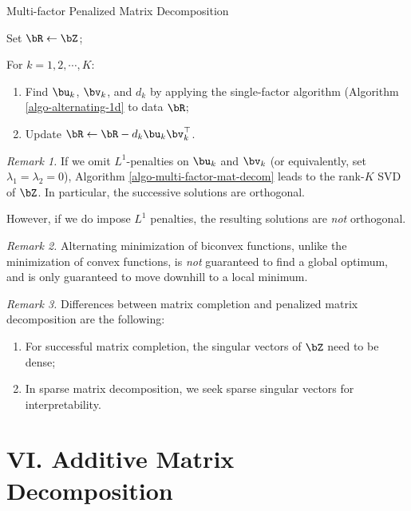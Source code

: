 \documentclass[12pt]{article}
\begin{document}
\begin{enumerate}[label=\textbf{\arabic*.}]
	\begin{minipage}{\linewidth}
		\begin{algorithm}[H]
		\caption{Multi-factor Penalized Matrix Decomposition}\label{algo-multi-factor-mat-decom}
		\begin{algorithmic}[1]
			\STATE Set $\bR \leftarrow \bZ$; 
			
			\STATE For $k = 1, 2, \cdots, K$: 
			
			\begin{enumerate}
				\item Find $\bu_k$, $\bv_k$, and $d_k$ by applying the single-factor algorithm (Algorithm \ref{algo-alternating-1d} to data $\bR$; 
				\item Update $\bR \leftarrow \bR - d_k \bu_k \bv_k^\top$. 
			\end{enumerate}
		\end{algorithmic}
	\end{algorithm}
	\end{minipage}
	
	\vspace{5pt}
	
	\textit{Remark 1.} If we omit $L^1$-penalties on $\bu_k$ and $\bv_k$ (or equivalently, set $\lambda_1 = \lambda_2 = 0$),  Algorithm \ref{algo-multi-factor-mat-decom} leads to the rank-$K$ SVD of $\bZ$. In particular, the successive solutions are orthogonal. 
	
	However, if we do impose $L^1$ penalties, the resulting solutions are \emph{not} orthogonal. 
	
	\textit{Remark 2.} Alternating minimization of biconvex functions, unlike the minimization of convex functions, is \emph{not} guaranteed to find a global optimum, and is only guaranteed to move downhill to a local minimum. 
	
	\textit{Remark 3.} Differences between matrix completion and penalized matrix decomposition are the following: 
	\begin{enumerate}
		\item For successful matrix completion, the singular vectors of $\bZ$ need to be dense; 
		\item In sparse matrix decomposition, we seek sparse singular vectors for interpretability. 
	\end{enumerate}
	
\end{enumerate}

	
\section*{VI. Additive Matrix Decomposition}
	
\end{document}
